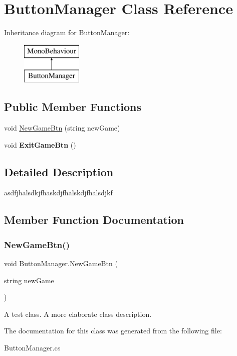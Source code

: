 \hypertarget{class_button_manager}{}\section{Button\+Manager Class Reference}
\label{class_button_manager}
Inheritance diagram for Button\+Manager\+:\begin{figure}[H]
\begin{center}
\leavevmode
\includegraphics[height=2.000000cm]{class_button_manager}
\end{center}
\end{figure}
\subsection*{Public Member Functions}
\begin{DoxyCompactItemize}
\item 
void \hyperlink{class_button_manager_ace626082f907af4428c5842e9b92a136}{New\+Game\+Btn} (string new\+Game)
\item 
\mbox{\label{class_button_manager_a4841ad4fd7809df2ca338169d646f272}} 
void {\bfseries Exit\+Game\+Btn} ()
\end{DoxyCompactItemize}


\subsection{Detailed Description}
asdfjhalsdkjfhaskdjfhalskdjfhalsdjkf 

\subsection{Member Function Documentation}
\mbox{\label{class_button_manager_ace626082f907af4428c5842e9b92a136}} 
\subsubsection{\texorpdfstring{New\+Game\+Btn()}{NewGameBtn()}}
{\footnotesize\ttfamily void Button\+Manager.\+New\+Game\+Btn (\begin{DoxyParamCaption}\item[{string}]{new\+Game }\end{DoxyParamCaption})}

A test class. A more elaborate class description. 

The documentation for this class was generated from the following file\+:\begin{DoxyCompactItemize}
\item 
Button\+Manager.\+cs\end{DoxyCompactItemize}
